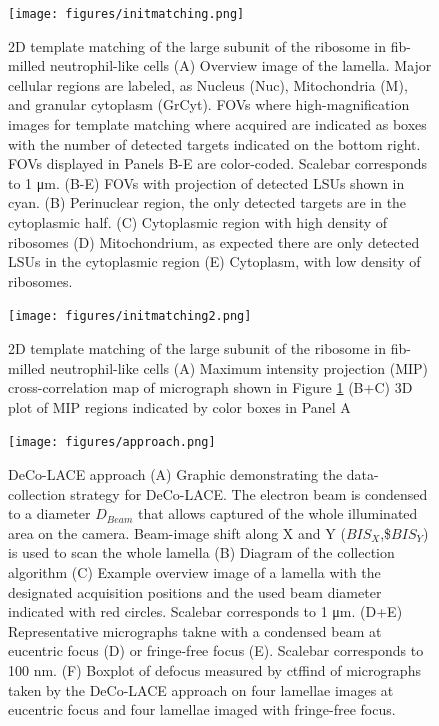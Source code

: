 \documentclass[
]{article}
\newenvironment{fignos:tagged-figure}[1][]{
    \let\oldthefigure\thefigure
    \let\oldtheHfigure\theHfigure
    \renewcommand{\thefigure}{#1}
    \renewcommand{\theHfigure}{#1}
  }{
    \let\thefigure\oldthefigure
    \let\theHfigure\oldtheHfigure
    \addtocounter{figure}{-1}
  }
\providecommand{\DIFaddbegin}{} %
\providecommand{\DIFaddend}{} %
\providecommand{\DIFdelbegin}{} %
\providecommand{\DIFdelend}{} %
\newcommand{\DIFscaledelfig}{0.5}
\newlength{\DIFdelgraphicswidth} %
\newlength{\DIFdelgraphicsheight} %
\newcommand{\DIFaddincludegraphics}[2][]{{\color{blue}\fbox{\DIFOincludegraphics[#1]{#2}}}} %
\newcommand{\DIFdelincludegraphics}[2][]{%
\sbox{\DIFdelgraphicsbox}{\DIFOincludegraphics[#1]{#2}}%
\settoboxwidth{\DIFdelgraphicswidth}{\DIFdelgraphicsbox} %
\settoboxtotalheight{\DIFdelgraphicsheight}{\DIFdelgraphicsbox} %
\scalebox{\DIFscaledelfig}{%
\parbox[b]{\DIFdelgraphicswidth}{\usebox{\DIFdelgraphicsbox}\\[-\baselineskip] \rule{\DIFdelgraphicswidth}{0em}}\llap{\resizebox{\DIFdelgraphicswidth}{\DIFdelgraphicsheight}{%
\setlength{\unitlength}{\DIFdelgraphicswidth}%
\begin{picture}(1,1)%
\thicklines\linethickness{2pt} %
{\color[rgb]{1,0,0}\put(0,0){\framebox(1,1){}}}%
{\color[rgb]{1,0,0}\put(0,0){\line( 1,1){1}}}%
{\color[rgb]{1,0,0}\put(0,1){\line(1,-1){1}}}%
\end{picture}%
}\hspace*{3pt}}} %
} %
\DeclareRobustCommand{\DIFaddbegin}{\DIFOaddbegin \let\includegraphics\DIFaddincludegraphics} %
\DeclareRobustCommand{\DIFaddend}{\DIFOaddend \let\includegraphics\DIFOincludegraphics} %
\DeclareRobustCommand{\DIFdelbegin}{\DIFOdelbegin \let\includegraphics\DIFdelincludegraphics} %
\DeclareRobustCommand{\DIFdelend}{\DIFOaddend \let\includegraphics\DIFOincludegraphics} %
\begin{document}
\begin{figure}
\hypertarget{fig:initmatching}{%
\centering
\texttt{[image: figures/initmatching.png]}
\caption{2D template matching of the large subunit of the ribosome in
fib-milled neutrophil-like cells (A) Overview image of the lamella.
Major cellular regions are labeled, as Nucleus (Nuc), Mitochondria (M),
and granular cytoplasm (GrCyt). FOVs where high-magnification images for
template matching where acquired are indicated as boxes with the number
of detected targets indicated on the bottom right. FOVs displayed in
Panels B-E are color-coded. Scalebar corresponds to 1 μm. (B-E) FOVs
with projection of detected LSUs shown in cyan. (B) Perinuclear region,
the only detected targets are in the cytoplasmic half. (C) Cytoplasmic
region with high density of ribosomes (D) Mitochondrium, as expected
there are only detected LSUs in the cytoplasmic region (E) Cytoplasm,
with low density of
ribosomes.}\label{fig:initmatching}
}
\end{figure}

\DIFdelbegin %
\DIFdelend \DIFaddbegin \begin{fignos:tagged-figure}
\DIFaddend 

\begin{figure}
\hypertarget{fig:initmatching2}{%
\centering
\texttt{[image: figures/initmatching2.png]}
\caption{2D template matching of the large subunit of the ribosome in
fib-milled neutrophil-like cells (A) Maximum intensity projection (MIP)
cross-correlation map of micrograph shown in Figure \ref{fig:initmatching}
(B+C) 3D plot of MIP regions indicated by color boxes in Panel
A}\label{fig:initmatching2}
}
\end{figure}

\end{fignos:tagged-figure}

\begin{figure}
\hypertarget{fig:approach}{%
\centering
\texttt{[image: figures/approach.png]}
\caption{DeCo-LACE approach (A) Graphic demonstrating the data-collection
strategy for DeCo-LACE. The electron beam is condensed to a diameter
\(D_{Beam}\) that allows captured of the whole illuminated area on the
camera. Beam-image shift along X and Y (\(BIS_X\),\$\(BIS_Y\)) is used to
scan the whole lamella (B) Diagram of the collection algorithm (C)
Example overview image of a lamella with the designated acquisition
positions and the used beam diameter indicated with red circles.
Scalebar corresponds to 1 μm. (D+E) Representative micrographs takne
with a condensed beam at eucentric focus (D) or fringe-free focus (E).
Scalebar corresponds to 100 nm. (F) Boxplot of defocus measured by
ctffind of micrographs taken by the DeCo-LACE approach on four lamellae
images at eucentric focus and four lamellae imaged with fringe-free
focus.}\label{fig:approach}
}
\end{figure}
\end{document}
